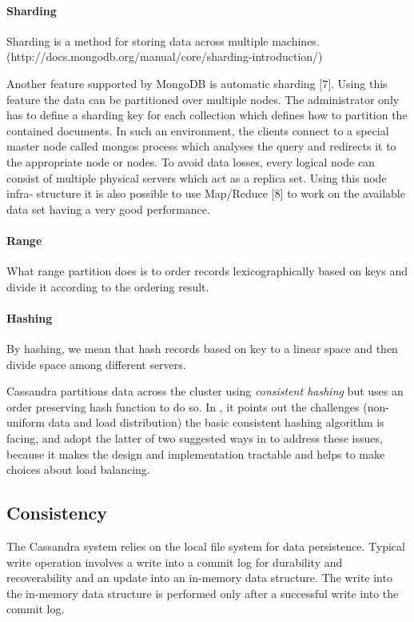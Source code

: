 \documentclass[12pt,letter]{article}
\begin{document}
\paragraph*{Sharding}
Sharding is a method for storing data across multiple machines. (http://docs.mongodb.org/manual/core/sharding-introduction/)

Another feature supported by MongoDB is automatic sharding [7]. Using this feature the data can be partitioned over multiple nodes. The administrator only has to define a sharding key for each collection which defines how to partition the contained documents. In such an environment, the clients connect to a special master node called mongos process which analyses the query and redirects it to the appropriate node or nodes. To avoid data losses, every logical node can consist of multiple physical servers which act as a replica set. Using this node infra- structure it is also possible to use Map/Reduce [8] to work on the available data set having a very good performance.

\paragraph*{Range}
What range partition does is to order records lexicographically based on keys and divide it according to the ordering result.

\paragraph*{Hashing}
By hashing, we mean that hash records based on key to a linear space and then divide space among different servers.

Cassandra partitions data across the cluster using \textit{consistent hashing} but uses an order preserving hash function to do so. In \citep{LakshamAvinash2010}, it points out the challenges (non-uniform data and load distribution) the basic consistent hashing algorithm\citep{Karger1997} is facing, and adopt the latter of two suggested ways in \citep{Stoica2003} to address these issues, because it makes the design and implementation tractable and helps to make choices about load balancing.

\subsection{Consistency}

The Cassandra system relies on the local file system for data persistence. Typical write operation involves a write into a commit log for durability and recoverability and an update into an in-memory data structure. The write into the in-memory data structure is performed only after a successful write into the commit log.
\end{document}
